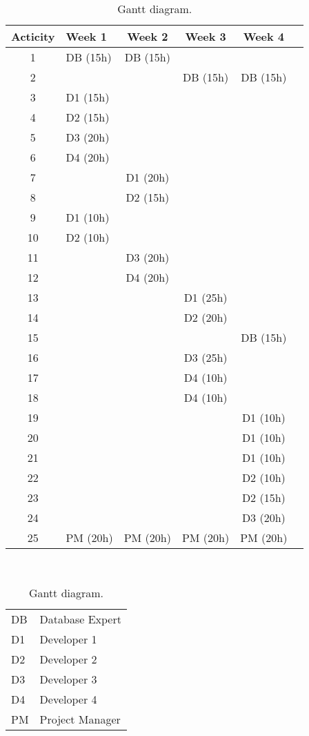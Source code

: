 \begin{table}
    \centering
	\begin{tabular}{|c|l|c|c|c|c|}
	\hline
	\textbf{Acticity}& \textbf{Week 1}& \textbf{Week 2}& \textbf{Week 3}& \textbf{Week 4}\\ \hline
	1 & DB (15h) & DB (15h) & & \\ 
	2 & & & DB (15h) & DB (15h)\\ 
	3 & D1 (15h) & & & \\ 
	4 & D2 (15h) & & & \\ 
	5 & D3 (20h) & & & \\ 
	6 & D4 (20h) & & & \\ 
	7 & & D1 (20h) & & \\ 
	8 & & D2 (15h) & & \\ 
	9 & D1 (10h) & & & \\ 
	10 & D2 (10h) & & & \\ 
	11 & & D3 (20h) & & \\ 
	12 & & D4 (20h) & & \\ 
	13 & & & D1 (25h) & \\ 
	14 & & & D2 (20h) & \\ 
	15 & & & & DB (15h) \\ 
	16 & & & D3 (25h) & \\
	17 & & & D4 (10h) & \\ 
	18 & & & D4 (10h) & \\ 
	19 & & & & D1 (10h) \\ 
	20 & & & & D1 (10h) \\ 
	21 & & & & D1 (10h) \\ 
	22 & & & & D2 (10h) \\ 
	23 & & & & D2 (15h) \\ 
	24 & & & & D3 (20h) \\ 
	25 & PM (20h) & PM (20h) & PM (20h) & PM (20h) \\ \hline
	\end{tabular}
\caption {Gantt diagram.}
\mbox{}\\
 \centering
	\begin{tabular}{l l}
	DB & Database Expert\\
	D1 & Developer 1\\
	D2 & Developer 2\\
	D3 & Developer 3\\
	D4 & Developer 4\\
	PM & Project Manager\\
	\end{tabular}

\end{table}